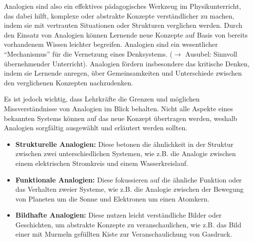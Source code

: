 \bip
Analogien sind also ein effektives p\"{a}dagogisches Werkzeug im Physikunterricht, das dabei hilft, komplexe oder abstrakte Konzepte verst\"{a}ndlicher zu machen, indem sie mit vertrauten Situationen oder Strukturen verglichen werden. Durch den Einsatz von Analogien k\"{o}nnen Lernende neue Konzepte auf Basis von bereits vorhandenem Wissen leichter begreifen. Analogien sind ein wesentlicher ``Mechanismus'' f\"{u}r die Vernetzung eines Denksystems. ($\to$ Ausubel: Sinnvoll \"{u}bernehmender Unterricht). Analogien f\"{o}rdern insbesondere das kritische Denken, indem sie Lernende anregen, \"{u}ber Gemeinsamkeiten und Unterschiede zwischen den verglichenen Konzepten nachzudenken.

\bip
Es ist jedoch wichtig, dass Lehrkr\"{a}fte die Grenzen und m\"{o}glichen Missverst\"{a}ndnisse von Analogien im Blick behalten. Nicht alle Aspekte eines bekannten Systems k\"{o}nnen auf das neue Konzept \"{u}bertragen werden, weshalb Analogien sorgf\"{a}ltig ausgew\"{a}hlt und erl\"{a}utert werden sollten.

\bip
{}

\begin{itemize}
\item{\textbf{Strukturelle Analogien:} Diese betonen die \"{a}hnlichkeit in der Struktur zwischen zwei unterschiedlichen Systemen, wie z.B. die Analogie zwischen einem elektrischen Stromkreis und einem Wasserkreislauf.}
\item{\textbf{Funktionale Analogien:} Diese fokussieren auf die \"{a}hnliche Funktion oder das Verhalten zweier Systeme, wie z.B. die Analogie zwischen der Bewegung von Planeten um die Sonne und Elektronen um einen Atomkern.}
\item{\textbf{Bildhafte Analogien:} Diese nutzen leicht verst\"{a}ndliche Bilder oder Geschichten, um abstrakte Konzepte zu veranschaulichen, wie z.B. das Bild einer mit Murmeln gef\"{u}llten Kiste zur Veranschaulichung von Gasdruck.}
\end{itemize}


